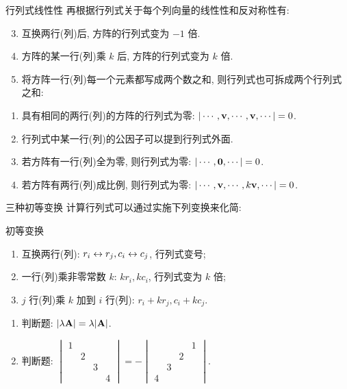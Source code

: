 \begin{frame}{行列式线性性}
	\onslide<+->
	再根据行列式关于每个列向量的线性性和反对称性有:
	\onslide<+->
	\begin{alertblock@}
		\begin{enumerate}
			\setcounter{enumi}{2}
			\item 互换两行(列)后, 方阵的行列式变为 $-1$ 倍.
			\item 方阵的某一行(列)乘 $k$ 后, 方阵的行列式变为 $k$ 倍.
			\item 将方阵一行(列)每一个元素都写成两个数之和, 则行列式也可拆成两个行列式之和:
		\end{enumerate}
	\end{alertblock@}
	\onslide<+->
	\begin{corollary}
		\begin{enumerate}
			\item 具有相同的两行(列)的方阵的行列式为零: $|\cdots,{\mathbf{v}},\cdots,{\mathbf{v}},\cdots|=0$.
			\item 行列式中某一行(列)的公因子可以提到行列式外面.
			\item 若方阵有一行(列)全为零, 则行列式为零: $|\cdots,{\bf0},\cdots|=0$.
			\item 若方阵有两行(列)成比例, 则行列式为零: $|\cdots,{\mathbf{v}},\cdots,k{\mathbf{v}},\cdots|=0$.
		\end{enumerate}
	\end{corollary}
\end{frame}


\begin{frame}{三种初等变换}
	\onslide<+->
	计算行列式可以通过实施下列变换来化简:
	\onslide<+->
	\begin{block}{初等变换}
		\begin{enumerate}
			\item 互换两行(列): \alert{$r_i\leftrightarrow r_j, c_i\leftrightarrow c_j$}, 行列式变号;
			\item 一行(列)乘\alert{非零常数} $k$: \alert{$kr_i, kc_i$}, 行列式变为 $k$ 倍;
			\item $j$ 行(列)乘 $k$ 加到 $i$ 行(列): \alert{$r_i+kr_j, c_i+kc_j$}.
		\end{enumerate}
	\end{block}
	\onslide<+->
	\begin{exercise}
		\begin{enumerate}
			\item 判断题: $|\lambda {\mathbf{A}}|=\lambda|{\mathbf{A}}|$. \visible<+->{\alert{$|\lambda \bfA|=\lambda^n|\bfA|$}}
			\item 判断题: $\begin{vmatrix}
				1&&&\\&2&&\\&&3&\\&&&4
			\end{vmatrix}=-\begin{vmatrix}
				&&&1\\&&2&\\&3&&\\4&&&
			\end{vmatrix}$. \visible<+->{\Huge\alert{$\times$}}
		\end{enumerate}
	\end{exercise}
\end{frame}


